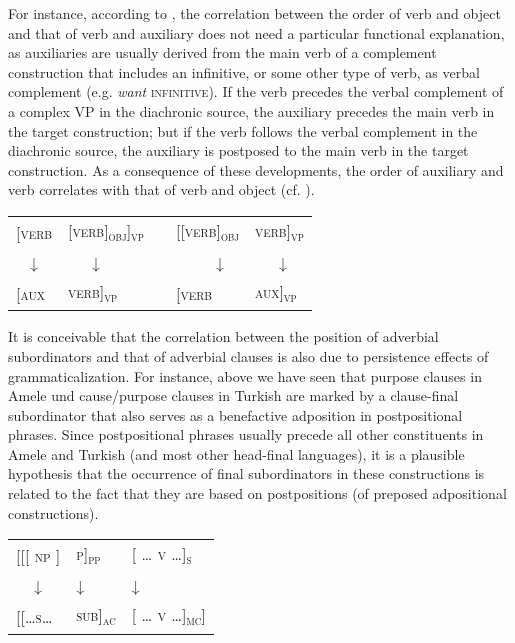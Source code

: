 \documentclass[output=paper]{langsci/langscibook}
\begin{document}
For instance, according to \citet[111]{Bybee2010}, the correlation between the order of verb and object and that of verb and auxiliary does not need a particular functional explanation, as auxiliaries are usually derived from the main verb of a complement construction that includes an infinitive, or some other type of verb, as verbal complement (e.g. \textit{want} \textsc{infinitive}). If the verb precedes the verbal complement of a complex VP in the diachronic source, the auxiliary precedes the main verb in the target construction; but if the verb follows the verbal complement in the diachronic source, the auxiliary is postposed to the main verb in the target construction. As a consequence of these developments, the order of auxiliary and verb correlates with that of verb and object (cf. ).

\ea\label{ex:diessel:18}
\begin{tabular}[t]{@{}llcll@{}}
{[\textsc{verb}} & {\textsc{[verb]\textsubscript{obj}]\textsubscript{vp}}} & \hspace{2cm} & {\textsc{[[verb]\textsubscript{obj}}} & {\textsc{verb]\textsubscript{vp}}} \\
\multicolumn{1}{c}{↓}  & ~~~↓ & & ~~~~~↓ & ~~~↓\\
{\textsc{[aux}}  & {\textsc{verb]\textsubscript{vp}}}                      &  & {\textsc{[verb}}  & {\textsc{aux]\textsubscript{vp}}}\\
\end{tabular}
\z

It is conceivable that the correlation between the position of adverbial subordinators and that of adverbial clauses is also due to persistence effects of grammaticalization. For instance, above we have seen that purpose clauses in Amele und cause/purpose clauses in Turkish are marked by a clause-final subordinator that also serves as a benefactive adposition in postpositional phrases. Since postpositional phrases usually precede all other constituents in Amele and Turkish (and most other head-final languages), it is a plausible hypothesis that the occurrence of final subordinators in these constructions is related to the fact that they are based on postpositions (of preposed adpositional constructions). 

\ea\label{ex:diessel:19}
\begin{tabular}[t]{@{}l@{ }ll@{}}
{[[[ \textsc{np} ]}  &   {\textsc{p]\textsubscript{pp}}} & {[ \textsc{… v …]\textsubscript{s}}} \\
\multicolumn{1}{c}{↓}  & ↓ & {[ \textsc{… }}↓\\
{\textsc{[[…s…}} & {\textsc{sub]\textsubscript{ac}}} &  {[ \textsc{… v …]\textsubscript{mc}}]}\\
\end{tabular}
\z
\end{document}
